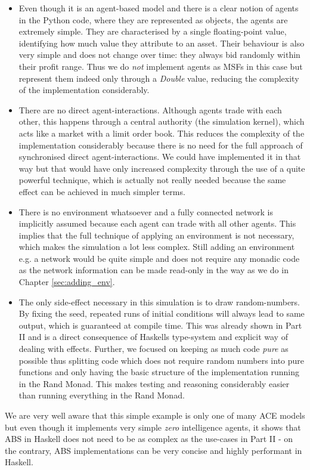 \begin{itemize}
	\item Even though it is an agent-based model and there is a clear notion of agents in the Python code, where they are represented as objects, the agents are extremely simple. They are characterised by a single floating-point value, identifying how much value they attribute to an asset. Their behaviour is also very simple and does not change over time: they always bid randomly within their profit range. Thus we do \textit{not} implement agents as MSFs in this case but represent them indeed only through a \textit{Double} value, reducing the complexity of the implementation considerably.

	\item There are no direct agent-interactions. Although agents trade with each other, this happens through a central authority (the simulation kernel), which acts like a market with a limit order book. This reduces the complexity of the implementation considerably because there is no need for the full approach of synchronised direct agent-interactions. We could have implemented it in that way but that would have only increased complexity through the use of a quite powerful technique, which is actually not really needed because the same effect can be achieved in much simpler terms.

	\item There is no environment whatsoever and a fully connected network is implicitly assumed because each agent can trade with all other agents. This implies that the full technique of applying an environment is not necessary, which makes the simulation a lot less complex. Still adding an environment e.g. a network would be quite simple and does not require any monadic code as the network information can be made read-only in the way as we do in Chapter \ref{sec:adding_env}.
	
	\item The only side-effect necessary in this simulation is to draw random-numbers. By fixing the seed, repeated runs of initial conditions will always lead to same output, which is guaranteed at compile time. This was already shown in Part II and is a direct consequence of Haskells type-system and explicit way of dealing with effects.	 Further, we focused on keeping as much code \textit{pure} as possible thus splitting code which does not require random numbers into pure functions and only having the basic structure of the implementation running in the Rand Monad. This makes testing and reasoning considerably easier than running everything in the Rand Monad.
\end{itemize}

We are very well aware that this simple example is only one of many ACE models but even though it implements very simple \textit{zero} intelligence agents, it shows that ABS in Haskell does not need to be as complex as the use-cases in Part II - on the contrary, ABS implementations can be very concise and highly performant in Haskell.